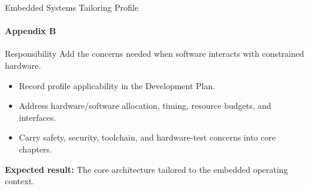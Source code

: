 \begin{frame}{Embedded Systems Tailoring Profile}
\framesubtitle{Appendix B}
\begin{block}{Responsibility}
Add the concerns needed when software interacts with constrained hardware.
\end{block}
\begin{itemize}
  \item Record profile applicability in the Development Plan.
  \item Address hardware/software allocation, timing, resource budgets, and interfaces.
  \item Carry safety, security, toolchain, and hardware-test concerns into core chapters.
\end{itemize}
\vspace{0.15cm}
\textbf{Expected result:} The core architecture tailored to the embedded operating context.
\end{frame}

